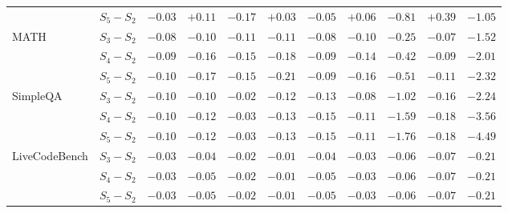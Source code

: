 \begin{tabular}{llrrrrrrrrr}
 & $S_5-S_2$ & $-0.03$ & $+0.11$ & $-0.17$ & $+0.03$ & $-0.05$ & $+0.06$ & $-0.81$ & $+0.39$ & $-1.05$ \\
\addlinespace[3pt]
MATH & $S_3-S_2$ & $-0.08$ & $-0.10$ & $-0.11$ & $-0.11$ & $-0.08$ & $-0.10$ & $-0.25$ & $-0.07$ & $-1.52$ \\
 & $S_4-S_2$ & $-0.09$ & $-0.16$ & $-0.15$ & $-0.18$ & $-0.09$ & $-0.14$ & $-0.42$ & $-0.09$ & $-2.01$ \\
 & $S_5-S_2$ & $-0.10$ & $-0.17$ & $-0.15$ & $-0.21$ & $-0.09$ & $-0.16$ & $-0.51$ & $-0.11$ & $-2.32$ \\
\addlinespace[3pt]
SimpleQA & $S_3-S_2$ & $-0.10$ & $-0.10$ & $-0.02$ & $-0.12$ & $-0.13$ & $-0.08$ & $-1.02$ & $-0.16$ & $-2.24$ \\
 & $S_4-S_2$ & $-0.10$ & $-0.12$ & $-0.03$ & $-0.13$ & $-0.15$ & $-0.11$ & $-1.59$ & $-0.18$ & $-3.56$ \\
 & $S_5-S_2$ & $-0.10$ & $-0.12$ & $-0.03$ & $-0.13$ & $-0.15$ & $-0.11$ & $-1.76$ & $-0.18$ & $-4.49$ \\
\addlinespace[3pt]
LiveCodeBench & $S_3-S_2$ & $-0.03$ & $-0.04$ & $-0.02$ & $-0.01$ & $-0.04$ & $-0.03$ & $-0.06$ & $-0.07$ & $-0.21$ \\
 & $S_4-S_2$ & $-0.03$ & $-0.05$ & $-0.02$ & $-0.01$ & $-0.05$ & $-0.03$ & $-0.06$ & $-0.07$ & $-0.21$ \\
 & $S_5-S_2$ & $-0.03$ & $-0.05$ & $-0.02$ & $-0.01$ & $-0.05$ & $-0.03$ & $-0.06$ & $-0.07$ & $-0.21$ \\
\bottomrule
\end{tabular}
